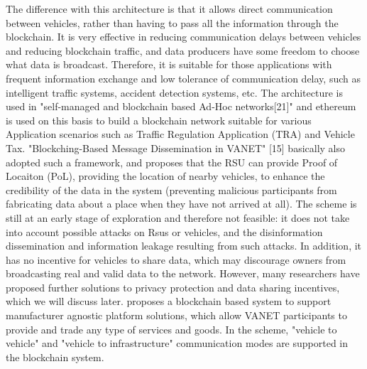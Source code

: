The difference with this architecture is that it allows direct communication between vehicles, rather than having to pass all the information through the blockchain. It is very effective in reducing communication delays between vehicles and reducing blockchain traffic, and data producers have some freedom to choose what data is broadcast. Therefore, it is suitable for those applications with frequent information exchange and low tolerance of communication delay, such as intelligent traffic systems, accident detection systems, etc. 
The architecture is used in "self-managed and blockchain based Ad-Hoc networks[21]" and ethereum is used on this basis to build a blockchain network suitable for various Application scenarios such as Traffic Regulation Application (TRA) and Vehicle Tax. 
"Blockching-Based Message Dissemination in VANET" [15] basically also adopted such a framework, and proposes that the RSU can provide Proof of Locaiton (PoL), providing the location of nearby vehicles, to enhance the credibility of the data in the system (preventing malicious participants from fabricating data about a place when they have not arrived at all). The scheme is still at an early stage of exploration and therefore not feasible: it does not take into account possible attacks on Rsus or vehicles, and the disinformation dissemination and information leakage resulting from such attacks. In addition, it has no incentive for vehicles to share data, which may discourage owners from broadcasting real and valid data to the network. However, many researchers have proposed further solutions to privacy protection and data sharing incentives, which we will discuss later. 
\cite{ref83} proposes a blockchain based system to support manufacturer agnostic platform solutions, which allow VANET participants to provide and trade any type of services and goods. In the scheme, "vehicle to vehicle" and "vehicle to infrastructure" communication modes are supported in the blockchain system.

%


